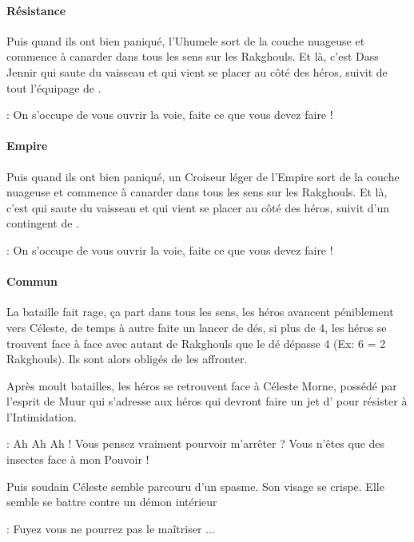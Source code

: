 \paragraph{Résistance}
Puis quand ils ont bien paniqué, l’Uhumele sort de la couche nuageuse et commence à canarder dans tous les sens sur les Rakghouls. Et là, c’est Dass Jennir qui saute du vaisseau et qui vient se placer au côté des héros, suivit de tout l’équipage de . 
\begin{quotebox}
    : On s’occupe de vous ouvrir la voie, faite ce que vous devez faire !
\end{quotebox}

\paragraph{Empire}
Puis quand ils ont bien paniqué, un Croiseur léger de l’Empire sort de la couche nuageuse et commence à canarder dans tous les sens sur les Rakghouls. Et là, c’est  qui saute du vaisseau et qui vient se placer au côté des héros, suivit d’un contingent de . 
\begin{quotebox}
    : On s’occupe de vous ouvrir la voie, faite ce que vous devez faire !
\end{quotebox}

\paragraph{Commun}
La bataille fait rage, ça part dans tous les sens, les héros avancent péniblement vers Céleste, de temps à autre faite un lancer de dés, si plus de 4, les héros se trouvent face à face avec autant de Rakghouls que le dé dépasse 4 (Ex: 6 = 2 Rakghouls). Ils sont alors obligés de les affronter.

Après moult batailles, les héros se retrouvent face à Céleste Morne, possédé par l’esprit de Muur qui s’adresse aux héros qui devront faire un jet d’ pour résister à l’Intimidation. 
\begin{quotebox}
    : Ah Ah Ah ! Vous pensez vraiment pourvoir m’arrêter ? Vous n’êtes que des insectes face à mon Pouvoir !
\end{quotebox}
    Puis soudain Céleste semble parcouru d’un spasme. Son visage se crispe. Elle semble se battre contre un démon intérieur \ldot
\begin{quotebox}
    : Fuyez vous ne pourrez pas le maîtriser ... 
\end{quotebox}

